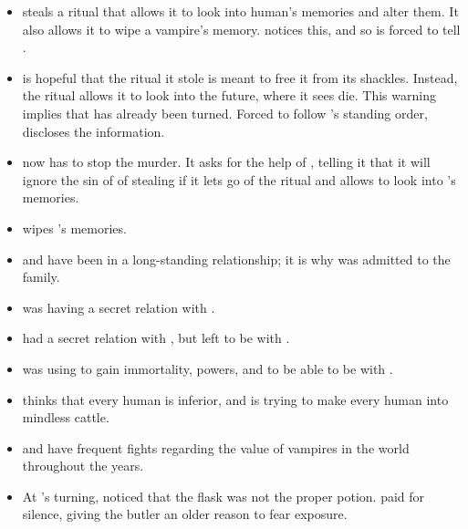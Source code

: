 \begin{itemize}
  \item {} steals a ritual that allows it to look into human's memories and alter them. It also allows it to wipe a vampire's memory.  notices this, and so is forced to tell .
  
  \item {} is hopeful that the ritual it stole is meant to free it from its shackles. Instead, the ritual allows it to look into the future, where it sees  die. This warning implies that  has already been turned. Forced to follow 's standing order,  discloses the information.
  
  \item {} now has to stop the murder. It asks for the help of , telling it that it will ignore the sin of  of stealing if it lets go of the ritual and allows  to look into 's memories.
  
  \item {} wipes 's memories.
  
  \item {} and  have been in a long-standing relationship; it is why  was admitted to the family.

  \item {} was having a secret relation with .

  \item {} had a secret relation with , but  left  to be with .

  \item {} was using  to gain immortality, powers, and to be able to be with .
      
  \item {} thinks that every human is inferior, and is trying to make every human into mindless cattle.
  
  \item {} and  have frequent fights regarding the value of vampires in the world throughout the years.
  
  \item At 's turning,  noticed that the flask was not the proper potion.  paid  for silence, giving the butler an older reason to fear exposure.


\end{itemize}
